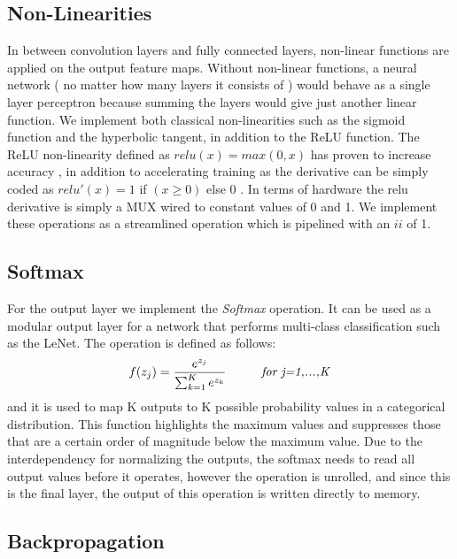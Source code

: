 \subsection{Non-Linearities} 

In between convolution layers and fully connected layers, non-linear functions are applied on the output feature maps. Without non-linear functions, a neural network ( no matter how many layers it consists of ) would behave as a single layer perceptron because summing the layers would give just another linear function. We implement both classical non-linearities such as the sigmoid function and the hyperbolic tangent, in addition to the ReLU function. The ReLU non-linearity  defined as $ relu(x)  = max(0, x) $ has proven to increase accuracy \cite{alexnet}, in addition to accelerating training as the derivative can be simply coded as $ relu'(x) = 1 $ if $ (x \geq 0 ) $ else $ 0 $ .  In terms of hardware the relu derivative is simply a MUX wired to constant values of 0 and 1. We implement these operations as a streamlined operation which is pipelined with an $ ii $ of 1.

\subsection{Softmax}

For the output layer we implement the \emph{Softmax} operation. It can be used as a modular output layer for a network that performs multi-class classification such as the LeNet. The operation is defined as follows: 
\begin{equation}
	f(z_j) = \frac{e^{z_j}}{\sum_{k=1}^{K} e^{z_k} } \hspace{1cm}  \mbox{\emph{for j=1,...,K}}
\end{equation}
and it is used to map K outputs to K possible probability values in a categorical distribution. This function highlights the maximum values and suppresses those that are a certain order of magnitude below the maximum value.  Due to the interdependency for normalizing the outputs, the softmax needs to read all output values before it operates, however the operation is unrolled, and since this is the final layer, the output of this operation is written directly to memory.

\subsection{Backpropagation}

